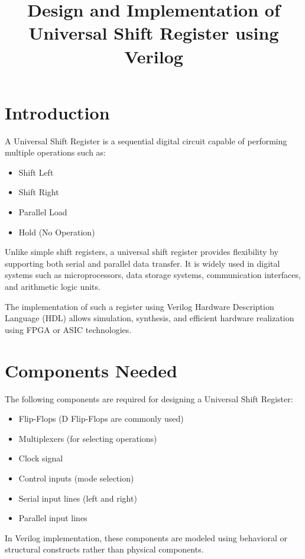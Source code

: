 \documentclass[12pt]{article}
\title{Design and Implementation of Universal Shift Register using Verilog}
\author{}
\date{}
\begin{document}
\maketitle

\section{Introduction}

A Universal Shift Register is a sequential digital circuit capable of performing multiple operations such as:
\begin{itemize}
    \item Shift Left
    \item Shift Right
    \item Parallel Load
    \item Hold (No Operation)
\end{itemize}

Unlike simple shift registers, a universal shift register provides flexibility by supporting both serial and parallel data transfer. It is widely used in digital systems such as microprocessors, data storage systems, communication interfaces, and arithmetic logic units.

The implementation of such a register using Verilog Hardware Description Language (HDL) allows simulation, synthesis, and efficient hardware realization using FPGA or ASIC technologies.

\section{Components Needed}

The following components are required for designing a Universal Shift Register:

\begin{itemize}
    \item Flip-Flops (D Flip-Flops are commonly used)
    \item Multiplexers (for selecting operations)
    \item Clock signal
    \item Control inputs (mode selection)
    \item Serial input lines (left and right)
    \item Parallel input lines
\end{itemize}

In Verilog implementation, these components are modeled using behavioral or structural constructs rather than physical components.
\end{document}
